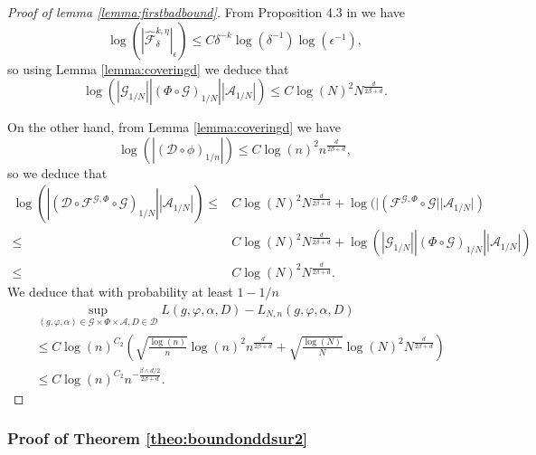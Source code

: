 \documentclass[10pt]{article}
\begin{document}
\begin{proof}[Proof of lemma \ref{lemma:firstbadbound}]
From Proposition 4.3 in \cite{stephanovitch2023wasserstein} we have 
$$\log(| \hat{\mathcal{F}}^{k,\eta}_\delta|_\epsilon)\leq C\delta^{-k}\log( \delta^{-1})\log(\epsilon^{-1}),$$
so using Lemma \ref{lemma:coveringd} we deduce that
\begin{equation}\label{eq:coveringprecise}
\log(|\mathcal{G}_{1/N}||(\Phi \circ \mathcal{G})_{1/N}||\mathcal{A}_{1/N}|)\leq C \log(N)^2 N^{\frac{d}{2\beta+d}}.
\end{equation}

On the other hand, from Lemma \ref{lemma:coveringd} we have 
\begin{equation}\label{eq:coveringpreciseD}
\log(|(\mathcal{D}\circ \phi)_{1/n}|)\leq  C \log(n)^2 n^{\frac{d}{2\beta+d}},
\end{equation}
so we deduce that
\begin{align}\label{align:boundcoverdcircf}
    \log(|(\mathcal{D}\circ\mathcal{F}^{\mathcal{G},\Phi}\circ \mathcal{G})_{1/N}||\mathcal{A}_{1/N}|) \leq&  C \log(N)^2 N^{\frac{d}{2\beta+d}}+\log(|(\mathcal{F}^{\mathcal{G},\Phi}\circ \mathcal{G}||\mathcal{A}_{1/N}|)\nonumber\\
    \leq&  C \log(N)^2 N^{\frac{d}{2\beta+d}}+\log(|\mathcal{G}_{1/N}||(\Phi \circ \mathcal{G})_{1/N}||\mathcal{A}_{1/N}|)\nonumber\\
    \leq& C \log(N)^2 N^{\frac{d}{2\beta+d}}.
\end{align}
We deduce that with probability at least $1-1/n$
\begin{align*}
&\sup_{(g,\varphi,\alpha)\in \mathcal{G}\times  \Phi\times \mathcal{A},D\in \mathcal{D}} L(g,\varphi,\alpha,D)-L_{N,n}(g,\varphi,\alpha,D)\\
& \leq C\log(n)^{C_2}\left(\sqrt{\frac{\log(n)}{n}}\log(n)^2 n^{\frac{d}{2\beta+d}}+\sqrt{\frac{\log(N)}{N}}\log(N)^2 N^{\frac{d}{2\beta+d}}\right)\\
& \leq C\log(n)^{C_2} n^{-\frac{\beta\wedge d/2}{2\beta+d}}. 
\end{align*}

\end{proof}



\subsubsection{Proof of Theorem \ref{theo:boundonddsur2}}\label{sec:theo:boundonddsur2}
\end{document}
